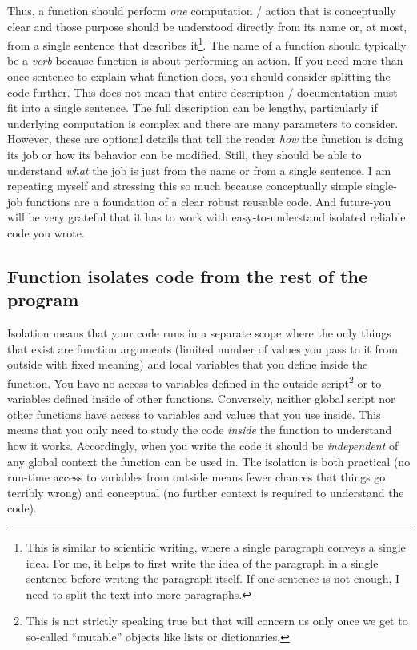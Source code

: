\documentclass[
]{book}
\begin{document}
Thus, a function should perform \emph{one} computation / action that is conceptually clear and those purpose should be understood directly from its name or, at most, from a single sentence that describes it\footnote{This is similar to scientific writing, where a single paragraph conveys a single idea. For me, it helps to first write the idea of the paragraph in a single sentence before writing the paragraph itself. If one sentence is not enough, I need to split the text into more paragraphs.}. The name of a function should typically be a \emph{verb} because function is about performing an action. If you need more than once sentence to explain what function does, you should consider splitting the code further. This does not mean that entire description / documentation must fit into a single sentence. The full description can be lengthy, particularly if underlying computation is complex and there are many parameters to consider. However, these are optional details that tell the reader \emph{how} the function is doing its job or how its behavior can be modified. Still, they should be able to understand \emph{what} the job is just from the name or from a single sentence. I am repeating myself and stressing this so much because conceptually simple single-job functions are a foundation of a clear robust reusable code. And future-you will be very grateful that it has to work with easy-to-understand isolated reliable code you wrote.

\hypertarget{function-isolates-code-from-the-rest-of-the-program}{%
\subsection{Function isolates code from the rest of the program}\label{function-isolates-code-from-the-rest-of-the-program}}

Isolation means that your code runs in a separate scope where the only things that exist are function arguments (limited number of values you pass to it from outside with fixed meaning) and local variables that you define inside the function. You have no access to variables defined in the outside script\footnote{This is not strictly speaking true but that will concern us only once we get to so-called ``mutable'' objects like lists or dictionaries.} or to variables defined inside of other functions. Conversely, neither global script nor other functions have access to variables and values that you use inside. This means that you only need to study the code \emph{inside} the function to understand how it works. Accordingly, when you write the code it should be \emph{independent} of any global context the function can be used in. The isolation is both practical (no run-time access to variables from outside means fewer chances that things go terribly wrong) and conceptual (no further context is required to understand the code).
\end{document}
